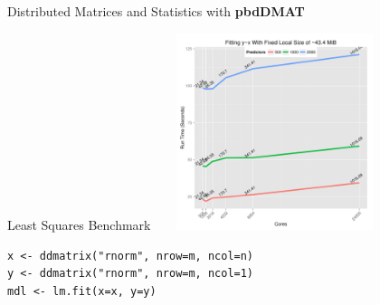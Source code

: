 \begin{frame}[fragile]
  \begin{block}{Distributed Matrices and Statistics with \textbf{pbdDMAT}}\pause
  \begin{center}
  \begin{minipage}{.9\textwidth}
  \centering\vspace{-.1cm}
	Least Squares Benchmark
		\includegraphics[width=7cm,height=5.75cm]{../common/pics/benchmarks/lmfit2}
  \end{minipage}
 \begin{minipage}{.9\textwidth}
\begin{lstlisting}[title=\ ,basicstyle=\scriptsize,numbers=none]
x <- ddmatrix("rnorm", nrow=m, ncol=n)
y <- ddmatrix("rnorm", nrow=m, ncol=1)
mdl <- lm.fit(x=x, y=y)
\end{lstlisting}
 \end{minipage}
 \end{center}
  \end{block}
\end{frame}


